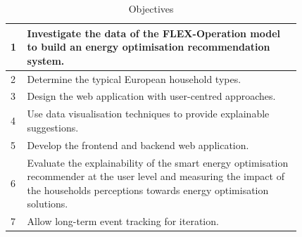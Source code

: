 \begin{table}[h]
    \begin{center}
        \begin{tabular}{ p{0.02\linewidth} p{0.8\linewidth} }
        \hline 
        \cellcolor{yellow!70!lime}1 & Investigate the data of the FLEX-Operation model to build an energy optimisation recommendation system. \\
        \hline 
        \cellcolor{yellow!60!lime}2 & Determine the typical European household types. \\
        \hline 
        \cellcolor{yellow!50!lime}3 & Design the web application with user-centred approaches. \\
        \hline 
        \cellcolor{yellow!40!lime}4 & Use data visualisation techniques to provide explainable suggestions. \\
        \hline 
        \cellcolor{yellow!30!lime}5 & Develop the frontend and backend web application. \\
        \hline 
        \cellcolor{yellow!20!lime}6 & Evaluate the explainability of the smart energy optimisation recommender at the user level and measuring the impact of the households perceptions towards energy optimisation solutions. \\
        \hline
        \cellcolor{yellow!10!lime}7 & Allow long-term event tracking for iteration. \\
        \hline 
        \end{tabular}
        \caption{Objectives}
        \label{tab:objectives}
    \end{center}
\end{table}

